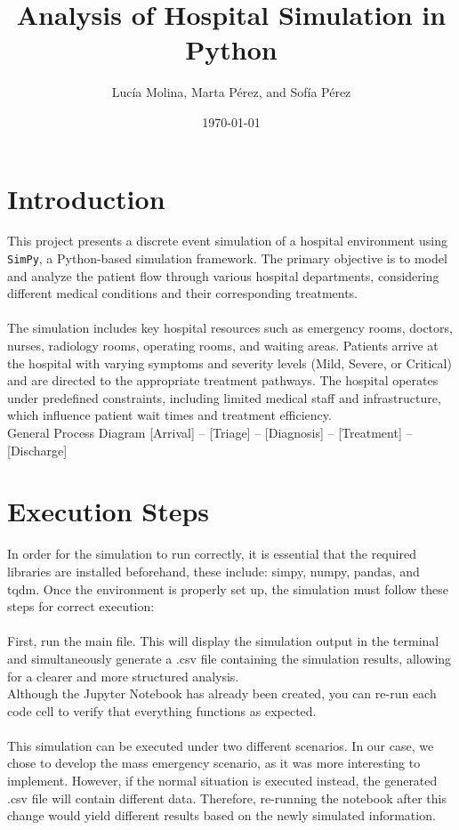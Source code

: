 \documentclass[a4paper,12pt]{article}
\title{Analysis of Hospital Simulation in Python}
\author{Lucía Molina, Marta Pérez, and Sofía Pérez}
\date{\today}
\begin{document}
\maketitle

\section{Introduction}
This project presents a discrete event simulation of a hospital environment using \texttt{SimPy}, a Python-based simulation framework. The primary objective is to model and analyze the patient flow through various hospital departments, considering different medical conditions and their corresponding treatments.
\\
\\
The simulation includes key hospital resources such as emergency rooms, doctors, nurses, radiology rooms, operating rooms, and waiting areas. Patients arrive at the hospital with varying symptoms and severity levels (Mild, Severe, or Critical) and are directed to the appropriate treatment pathways. The hospital operates under predefined constraints, including limited medical staff and infrastructure, which influence patient wait times and treatment efficiency.
\\
General Process Diagram
[Arrival] -- [Triage] -- [Diagnosis] -- [Treatment] -- [Discharge]
\section{Execution Steps}
In order for the simulation to run correctly, it is essential that the required libraries are installed beforehand, these include: simpy, numpy, pandas, and tqdm. Once the environment is properly set up, the simulation must follow these steps for correct execution:
\\
\\
First, run the main file. This will display the simulation output in the terminal and simultaneously generate a .csv file containing the simulation results, allowing for a clearer and more structured analysis.
\\
Although the Jupyter Notebook has already been created, you can re-run each code cell to verify that everything functions as expected.
\\
\\
This simulation can be executed under two different scenarios. In our case, we chose to develop the mass emergency scenario, as it was more interesting to implement. However, if the normal situation is executed instead, the generated .csv file will contain different data. Therefore, re-running the notebook after this change would yield different results based on the newly simulated information.
\\
\end{document}
